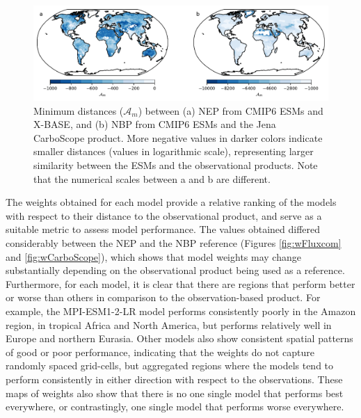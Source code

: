 \documentclass[gmd, manuscript]{copernicus}
\begin{document}
\begin{figure}[t]
   \centering
   \includegraphics[width=14cm]{Figures/Amin.pdf} %
   \caption{Minimum distances ($\mathcal{A}_m$) between (a) NEP from CMIP6 ESMs and X-BASE, and (b) NBP from CMIP6 ESMs and the Jena CarboScope product. More negative values in darker colors indicate smaller distances (values in logarithmic scale), representing larger similarity between the ESMs and the observational products. Note that the numerical scales between a and b are different.}
   \label{fig:Am}
\end{figure}

The weights obtained for each model provide a relative ranking of the models with respect to their distance to the observational product, and serve as a suitable metric to assess model performance. 
The values obtained differed considerably between the NEP and the NBP reference (Figures \ref{fig:wFluxcom} and \ref{fig:wCarboScope}), which shows that model weights may change substantially depending on the observational product being used as a reference.
Furthermore, for each model, it is clear that there are regions that perform better or worse than others in comparison to the observation-based product. For example, the MPI-ESM1-2-LR model performs consistently poorly in the Amazon region, in tropical Africa and North America, but performs relatively well in Europe and northern Eurasia. Other models also show consistent spatial patterns of good or poor performance, indicating that the weights do not capture randomly spaced grid-cells, but aggregated regions where the models tend to perform consistently in either direction with respect to the observations. 
These maps of weights also show that there is no one single model that performs best everywhere, or contrastingly, one single model that performs worse everywhere. 
\end{document}
